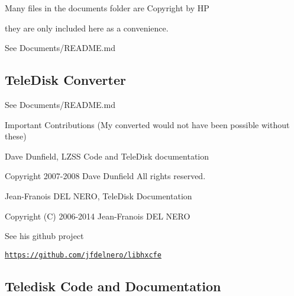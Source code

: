 \begin{DoxyItemize}
\item Many files in the documents folder are Copyright by HP
\begin{DoxyItemize}
\item they are only included here as a convenience.
\end{DoxyItemize}
\item See Documents/\+R\+E\+A\+D\+M\+E.\+md
\end{DoxyItemize}





\subsection*{Tele\+Disk Converter}


\begin{DoxyItemize}
\item See Documents/\+R\+E\+A\+D\+M\+E.\+md
\begin{DoxyItemize}
\item Important Contributions (My converted would not have been possible without these)
\begin{DoxyItemize}
\item Dave Dunfield, L\+Z\+SS Code and Tele\+Disk documentation
\begin{DoxyItemize}
\item Copyright 2007-\/2008 Dave Dunfield All rights reserved.
\end{DoxyItemize}
\item Jean-\/\+Franois D\+EL N\+E\+RO, Tele\+Disk Documentation
\begin{DoxyItemize}
\item Copyright (C) 2006-\/2014 Jean-\/\+Franois D\+EL N\+E\+RO
\item See his github project
\begin{DoxyItemize}
\item \href{https://github.com/jfdelnero/libhxcfe}{\tt https\+://github.\+com/jfdelnero/libhxcfe}
\end{DoxyItemize}
\end{DoxyItemize}
\end{DoxyItemize}
\end{DoxyItemize}
\end{DoxyItemize}





\subsection*{Teledisk Code and Documentation}


